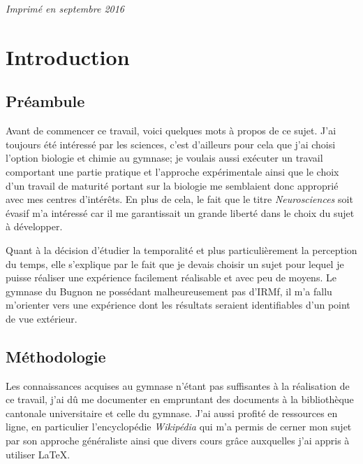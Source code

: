 \documentclass[12pt,fleqn,oneside]{book} %
\let\cleardoublepage\clearpage %
\begin{document}
\noindent \textit{Imprimé en septembre 2016} %



\pagestyle{empty} %

\tableofcontents %


\pagestyle{fancy} %



\chapter{Introduction}
\section{Préambule}
Avant de commencer ce travail, voici quelques mots à propos de ce sujet. J'ai toujours été intéressé par les sciences, c'est d'ailleurs pour cela que j'ai choisi l'option biologie et chimie au gymnase; je voulais aussi exécuter un travail comportant une partie pratique et l'approche expérimentale ainsi que le choix d'un travail de maturité portant sur la biologie me semblaient donc approprié avec mes centres d'intérêts. En plus de cela, le fait que le titre \textit{Neurosciences} soit évasif m'a intéressé car il me garantissait un grande liberté dans le choix du sujet à développer.

Quant à la décision d'étudier la temporalité et plus particulièrement la perception du temps, elle s'explique par le fait que je devais choisir un sujet pour lequel je puisse réaliser une expérience facilement réalisable et avec peu de moyens. Le gymnase du Bugnon ne possédant malheureusement pas d'IRMf, il m'a fallu m'orienter vers une expérience dont les résultats seraient identifiables d'un point de vue extérieur. 

\section{Méthodologie}
Les connaissances acquises au gymnase n'étant pas suffisantes à la réalisation de ce travail, j'ai dû me documenter en empruntant des documents à la bibliothèque cantonale universitaire et celle du gymnase. J'ai aussi profité de ressources en ligne, en particulier l'encyclopédie \textit{Wikipédia} qui m'a permis de cerner mon sujet par son approche généraliste ainsi que divers cours grâce auxquelles j'ai appris à utiliser \LaTeX. 
\end{document}
